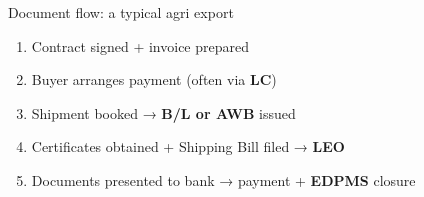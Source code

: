 \documentclass[
  ignorenonframetext,
  aspectratio=169,
]{beamer}
\makeatletter
\providecommand{\tightlist}{%
  \setlength{\itemsep}{0pt}\setlength{\parskip}{0pt}}
\let\quarto@originallabel\label
\DeclareRobustCommand*{\label}[1]{\quarto@originallabel{#1}}
\makeatother
\begin{document}
\begin{frame}
\begin{block}{Document flow: a typical agri export}
\label{document-flow-a-typical-agri-export}
\begin{enumerate}
\tightlist
\item
  Contract signed + invoice prepared
\item
  Buyer arranges payment (often via \textbf{LC})
\item
  Shipment booked → \textbf{B/L or AWB} issued
\item
  Certificates obtained + Shipping Bill filed → \textbf{LEO}
\item
  Documents presented to bank → payment + \textbf{EDPMS} closure
\end{enumerate}
\end{block}
\end{frame}
\end{document}
